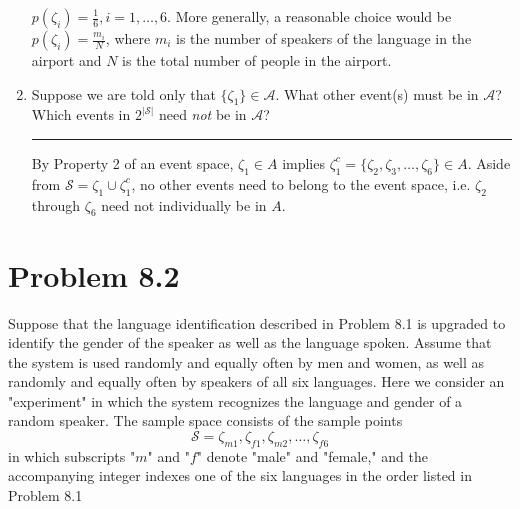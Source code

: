 \documentclass{article}
\newcommand{\horline}
           {\begin{center}
              \noindent\rule{8cm}{0.4pt}
            \end{center}}
\begin{document}
\begin{enumerate}[label=(\alph*)]
{      $p(\zeta_i) = \frac{1}{6}, i = 1, \dots, 6$. More generally, a 
      reasonable choice would be $p(\zeta_i) = \frac{m_i}{N}$, where $m_i$
      is the number of speakers of the language in the airport and $N$ is 
      the total number of people in the airport.
     }
\item{Suppose we are told only that $\{\zeta_1\} \in \mathcal{A}$. What 
      other event(s) must be in $\mathcal{A}$? Which events in 
      $2^{|\mathcal{S}|}$ need \textit{not} be in $\mathcal{A}$?
      \horline
      By Property 2 of an event space, $\zeta_1 \in A$ implies
      $\zeta_1^c = \{\zeta_2, \zeta_3, \dots, \zeta_6\} \in A$.  Aside from
      $\mathcal{S} = \zeta_1 \cup \zeta_1^c$, no other events need to 
      belong to the event space, i.e. $\zeta_2$ through $\zeta_6$ need not
      individually be in $A$.
     }
\end{enumerate}

\section*{Problem 8.2}
Suppose that the language identification described in Problem 8.1 is
upgraded to identify the gender of the speaker as well as the language
spoken. Assume that the system is used randomly and equally often by men
and women, as well as randomly and equally often by speakers of all six
languages. Here we consider an "experiment" in which the system recognizes
the language and gender of a random speaker. The sample space consists of
the sample points
$$\mathcal{S} = \zeta_{m1}, \zeta_{f1}, \zeta_{m2}, \dots, \zeta_{f6}$$
in which subscripts "$m$" and "$f$" denote "male" and "female," and the
accompanying integer indexes one of the six languages in the order listed
in Problem 8.1
\end{document}
